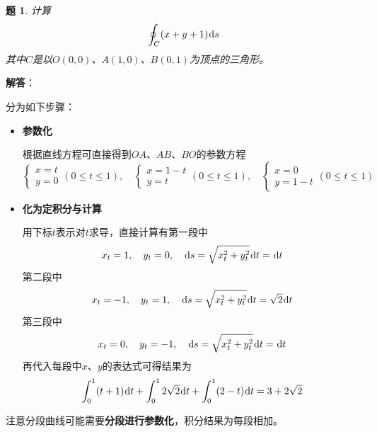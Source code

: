 \documentclass[a4paper,UTF8,fontset=windows,AutoFakeBold]{ctexart}
\newcommand*{\dr}{\hspace{0.07em}\mathrm{d}}
\newcommand*{\note}{\noindent *}
\theoremstyle{ex}
\newtheorem{exercise}{题}
\newcommand{\sol}[1]{{\vspace{5pt}\kaishu\noindent\textbf{解答}：\vspace{-3pt}
\begin{compactitem}
    \item[] #1
\end{compactitem}
}}
\begin{document}
\begin{framed}
\begin{exercise}
    计算
    $$\oint_C(x+y+1)\dr s$$
    其中$C$是以$O(0,0)$、$A(1,0)$、$B(0,1)$为顶点的三角形。
\end{exercise}
\sol{
    分为如下步骤：
    \begin{itemize}
        \item \textbf{参数化}
                
        根据直线方程可直接得到$OA$、$AB$、$BO$的参数方程
        $$\begin{cases}x=t\\y=0\end{cases}(0\le t\le1),\quad\begin{cases}x=1-t\\y=t\end{cases}(0\le t\le1),\quad\begin{cases}x=0\\y=1-t\end{cases}(0\le t\le1)$$

        \item \textbf{化为定积分与计算}
                
        用下标$t$表示对$t$求导，直接计算有第一段中
        $$x_t=1,\quad y_t=0,\quad\dr s=\sqrt{x_t^2+y_t^2}\dr t=\dr t$$
        第二段中
        $$x_t=-1,\quad y_t=1,\quad\dr s=\sqrt{x_t^2+y_t^2}\dr t=\sqrt2\dr t$$
        第三段中
        $$x_t=0,\quad y_t=-1,\quad\dr s=\sqrt{x_t^2+y_t^2}\dr t=\dr t$$
        再代入每段中$x$、$y$的表达式可得结果为
        $$\int_0^1(t+1)\dr t+\int_0^12\sqrt2\dr t+\int_0^1(2-t)\dr t=3+2\sqrt2$$
        \end{itemize}
}
\end{framed}

\note 注意分段曲线可能需要\textbf{分段进行参数化}，积分结果为每段相加。

\
\end{document}
